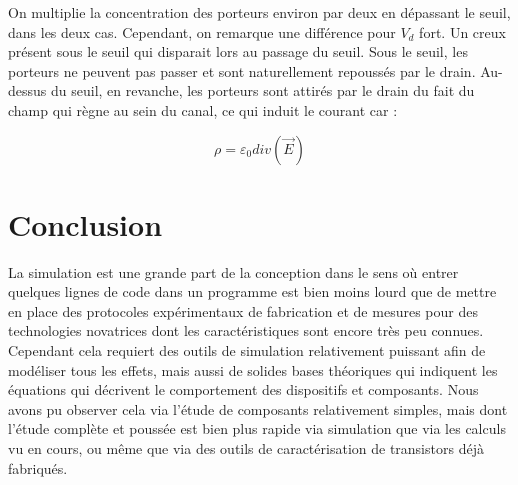 \documentclass[a4paper,11pt]{report}
\begin{document}
On multiplie la concentration des porteurs environ par deux en dépassant le seuil, dans les deux cas. Cependant, on remarque une différence pour $V_d$ fort. Un creux présent sous le seuil qui disparait lors au passage du seuil. Sous le seuil, les porteurs ne peuvent pas passer et sont naturellement repoussés par le drain. Au-dessus du seuil, en revanche, les porteurs sont attirés par le drain du fait du champ qui règne au sein du canal, ce qui induit le courant car :

\[\rho=\varepsilon_0div(\vec{E})\]


\chapter*{Conclusion}

La simulation est une grande part de la conception dans le sens où entrer quelques lignes  de code dans un programme est bien moins lourd que de mettre en place des protocoles expérimentaux de fabrication et de mesures pour des technologies novatrices dont les caractéristiques sont encore très peu connues. Cependant cela requiert des outils de simulation relativement puissant afin de modéliser tous les effets, mais aussi de solides bases théoriques qui indiquent les équations qui décrivent le comportement des dispositifs et composants. Nous avons pu observer cela via l'étude de composants relativement simples, mais dont l'étude complète et poussée est bien plus rapide via simulation que via les calculs vu en cours, ou même que via des outils de caractérisation de transistors déjà fabriqués.
\end{document}
